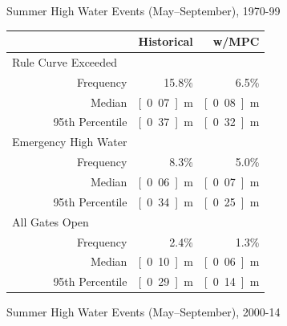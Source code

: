 \documentclass[compress,english]{beamer}
\begin{document}
{{{{{{\begin{frame}{Summer High Water Events (May--September), 1970-99}
\begin{center}
\begin{tabular}{lrrr}\toprule
\qquad\qquad\qquad\quad & & Historical & w/MPC	\\
\midrule
\multicolumn{2}{l}{Rule Curve Exceeded} & & \\
& Frequency & 15.8\% & 6.5\% \\
& Median & \unit[0.07]{m} & \unit[0.08]{m}\\
& 95th Percentile & \unit[0.37]{m} & \unit[0.32]{m}\\
\midrule
\multicolumn{2}{l}{Emergency High Water} & & \\
& Frequency & 8.3\% & 5.0\%\\
& Median & \unit[0.06]{m} & \unit[0.07]{m} \\
& 95th Percentile & \unit[0.34]{m} & \unit[0.25]{m} \\
\midrule
\multicolumn{2}{l}{All Gates Open} & &\\
& Frequency & 2.4\% & 1.3\% \\
& Median & \unit[0.10]{m} & \unit[0.06]{m}\\
& 95th Percentile & \unit[0.29]{m} & \unit[0.14]{m} \\
\midrule
\end{tabular}
\end{center}

\vspace*{3mm}
\vfill

\end{frame}

\begin{frame}{Summer High Water Events (May--September), 2000-14}


\end{frame}}}}}}}
\end{document}
